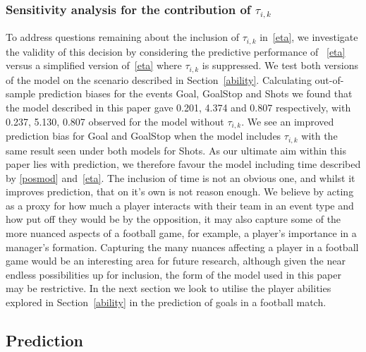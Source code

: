 \documentclass[11pt,a4paper]{article}
\begin{document}
\subsubsection*{Sensitivity analysis for the contribution of {\boldmath$\tau_{i, k}$}} 

To address questions remaining about the inclusion of $\tau_{i,k}$ in~\eqref{eta}, we investigate the validity of this decision by considering the predictive 
performance of ~\eqref{eta} versus a simplified version of~\eqref{eta} 
where $\tau_{i,k}$ is suppressed. We test both versions of the model 
on the scenario described in Section~\ref{ability}. Calculating 
out-of-sample prediction biases for the events Goal, GoalStop and Shots 
we found that the model described in this paper gave 0.201, 4.374 and 0.807 
respectively, with 0.237, 5.130, 0.807 observed for the model without 
$\tau_{i,k}$.
We see an improved prediction bias for Goal and GoalStop when the model 
includes $\tau_{i,k}$ with the same result seen under both models for 
Shots. As our ultimate aim within this paper lies with prediction, we 
therefore favour the model including time described by 
\eqref{posmod} and~\eqref{eta}. The inclusion of time is not an obvious 
one, and whilst it improves prediction, that on it's own is not reason 
enough. We believe by acting as a proxy for how much a player 
interacts with their team in an event type and how put off they would 
be by the opposition, it may also capture some of the more nuanced 
aspects of a football game, for example, a player's importance in a 
manager's formation. Capturing the many nuances affecting a player in 
a football game would be an interesting area for future research, 
although given the near endless possibilities up for inclusion, the form 
of the model used in this paper may be restrictive. In the next section we look to 
utilise the player abilities explored in Section~\ref{ability} in the prediction of goals in a football 
match.










    \subsection{Prediction} \label{prediction}
    
\end{document}
